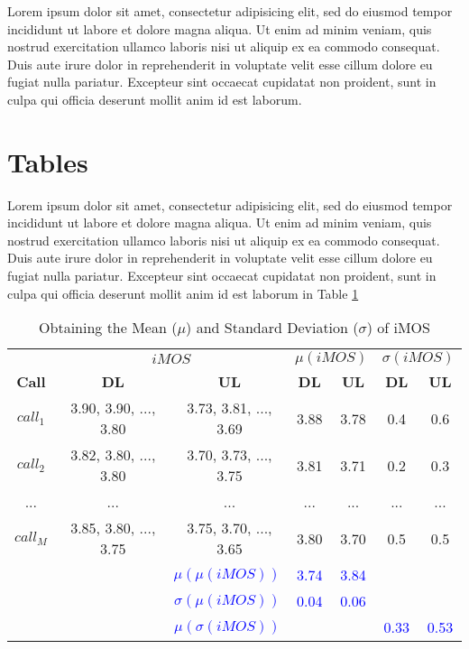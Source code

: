 Lorem ipsum dolor sit amet, consectetur adipisicing elit, sed do eiusmod
tempor incididunt ut labore et dolore magna aliqua. Ut enim ad minim veniam,
quis nostrud exercitation ullamco laboris nisi ut aliquip ex ea commodo
consequat. Duis aute irure dolor in reprehenderit in voluptate velit esse
cillum dolore eu fugiat nulla pariatur. Excepteur sint occaecat cupidatat non
proident, sunt in culpa qui officia deserunt mollit anim id est laborum.

\section{Tables}
\label{sec:tables}

Lorem ipsum dolor sit amet, consectetur adipisicing elit, sed do eiusmod
tempor incididunt ut labore et dolore magna aliqua. Ut enim ad minim veniam,
quis nostrud exercitation ullamco laboris nisi ut aliquip ex ea commodo
consequat. Duis aute irure dolor in reprehenderit in voluptate velit esse
cillum dolore eu fugiat nulla pariatur. Excepteur sint occaecat cupidatat non
proident, sunt in culpa qui officia deserunt mollit anim id est laborum in Table \ref{table_label}

\begin{table}[h!]
    \centering
    \begin{tabular}{ccccccc}
    \toprule
     & \multicolumn{2}{c}{\bf{$iMOS$}} & \multicolumn{2}{c}{\bf{$\mu(iMOS)$}} & \multicolumn{2}{c}{\bf{$\sigma(iMOS)$}}\\
    \cmidrule(r){2-3} \cmidrule(r){4-5} \cmidrule(r){6-7}
    \bf{Call} & \bf{DL} & \bf{UL} & \bf{DL} & \bf{UL} & \bf{DL} & \bf{UL}\\ 
    \cmidrule(r){1-1} \cmidrule(r){2-7}
    $call_1$ & 3.90, 3.90, ..., 3.80 & 3.73, 3.81, ..., 3.69 & 3.88 & 3.78 & 0.4 & 0.6 \\ 
    $call_2$ & 3.82, 3.80, ..., 3.80 & 3.70, 3.73, ..., 3.75 & 3.81 & 3.71 & 0.2 & 0.3 \\
    ... & ... & ... & ... & ... & ... & ... \\ 
    $call_M$ & 3.85, 3.80, ..., 3.75 & 3.75, 3.70, ..., 3.65 & 3.80 & 3.70 & 0.5 & 0.5 \\
    \midrule
    
    & \multicolumn{2}{r}{\textcolor{blue}{$\mu(\mu(iMOS))$}} & \textcolor{blue}{3.74} & \textcolor{blue}{3.84} & & \\
    
    & \multicolumn{2}{r}{\textcolor{blue}{$\sigma(\mu(iMOS))$}} & \textcolor{blue}{0.04} & \textcolor{blue}{0.06} & &  \\
    
    & \multicolumn{2}{r}{\textcolor{blue}{$\mu(\sigma(iMOS))$}} &  & & \textcolor{blue}{0.33} & \textcolor{blue}{0.53} \\
    
    \bottomrule
    \end{tabular}
    \caption{Obtaining the Mean ($\mu$) and Standard Deviation ($\sigma$) of iMOS}
    \label{table_label}
  \end{table}

